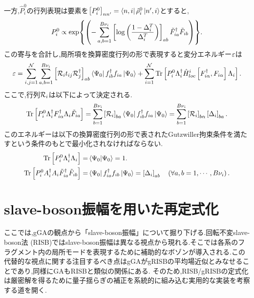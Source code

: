 一方,$\hat{P}^{0}_{i}$の行列表現は要素を$\left[ P^{0}_{i} \right]_{nn'}=\Bra{n,i}\hat{\rho}^{0}_{i}\Ket{n',i}$とすると,
\begin{equation}
    P^{0}_{i}\propto \exp{ \left( -\sum_{a,b=1}^{B\nu_{i}} \left[ \log{ \left( \frac{1-\Delta^{T}_{i}}{\Delta^{T}_{i}} \right)} \right]_{ab}\tilde{F}^\dagger_{ia}\tilde{F}_{ib} \right)}.
\end{equation}
この寄与を合計し,局所項を換算密度行列の形で表現すると変分エネルギー$\varepsilon$は
\begin{equation}
    \varepsilon=\sum_{i,j=1}^{\mathcal{N}}\sum_{a,b=1}^{B\nu_{i}}\left[ \mathcal{R}_{i}t_{ij}\mathcal{R}^\dagger_{j} \right]_{ab}\Bra{\Psi_{0}}f^\dagger_{ib}f_{ia}\Ket{\Psi_{0}}+\sum_{i=1}^{\mathcal{N}}\Tr \left[ P^{0}_{i}\Lambda^\dagger_{i}\hat{H}^{i}_{loc}\left[ F^\dagger_{i\alpha},F_{i\alpha} \right]\Lambda_{i} \right].
\end{equation}
ここで,行列$\mathcal{R}_{i}$は以下によって決定される.
\begin{equation}
    \Tr \left[ P^{0}_{i}\Lambda^\dagger_{i}F^\dagger_{i\alpha}\Lambda_{i}\tilde{F}_{ia} \right]=\sum_{b=1}^{B\nu_{i}}\left[ \mathcal{R}_{i} \right]_{ba}\Bra{\Psi_{0}}f^\dagger_{ib}f_{ia}\Ket{\Psi_{0}}=\sum_{b=1}^{B\nu_{i}}\left[ \mathcal{R}_{i} \right]_{b\alpha}\left[ \Delta_{i} \right]_{ba}.  \label{R-i-1}
\end{equation}
このエネルギーは以下の換算密度行列の形で表されたGutzwiller拘束条件を満たすという条件のもとで最小化されなければならない.
\begin{align}
    \Tr \left[ P^{0}_{i}\Lambda^\dagger_{i}\Lambda_{i} \right]=&\braket{\Psi_{0}}=1. \label{10-5}\\
    \Tr \left[ P^{0}_{i}A^\dagger_{i}A_{i}\tilde{F}^\dagger_{ia}\tilde{F}_{ib} \right]=&\Bra{\Psi_{0}}f^\dagger_{ia}f_{ib}\Ket{\Psi_{0}}=\left[ \Delta_{i} \right]_{ab}\quad \left( \forall a,b=1,\cdots ,B\nu_{i} \right). \label{10-6}
\end{align}

\section{slave-boson振幅を用いた再定式化}
ここでは,gGAの観点から「slave-boson振幅」について掘り下げる.回転不変slave-boson法 (RISB)ではslave-boson振幅は異なる視点から現れる.そこでは各系のフラグメント内の局所モードを表現するために補助的なボゾンが導入される.この代替的な視点に関する注目するべき点はgGAがgRISBの平均場近似とみなせることであり,同様にGAもRISBと類似の関係にある.
そのため,RISB/gRISBの定式化は厳密解を得るために量子揺らぎの補正を系統的に組み込む実用的な実装を考察する道を開く.
